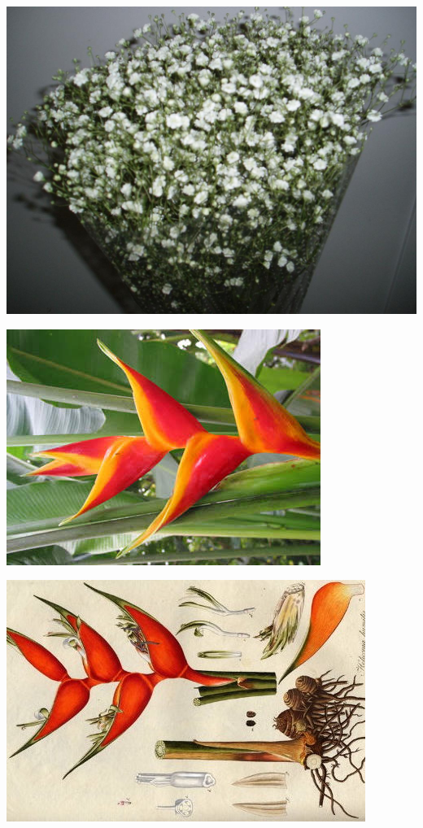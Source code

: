 \documentclass{article}
\begin{document}
\begin{center}
\includegraphics[height=0.925\paperheight]{../Gypsophilia.jpg}
\end{center}
\newpage

\begin{center}
\includegraphics[height=0.925\paperheight]{../Heliconia.jpg}
\end{center}
\newpage

\begin{center}
\includegraphics[height=0.925\paperheight]{../Heliconia_humilisJacquin.jpg}
\end{center}
\newpage
\end{document}
